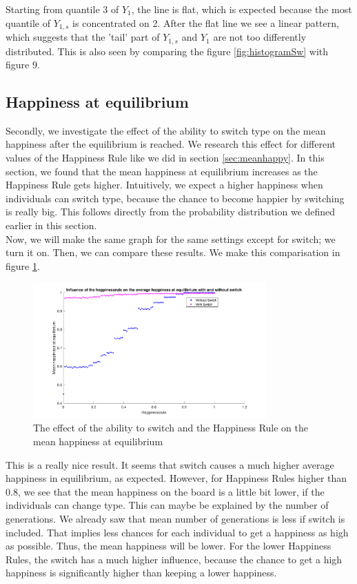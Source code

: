 Starting from quantile 3 of $Y_1$, the line is flat, which is expected because the most quantile of $Y_{1,s}$ is concentrated on 2. After the flat line we see a linear pattern, which suggests that the 'tail' part of $Y_{1,s}$ and $Y_1$ are not too differently distributed. This is also seen by comparing the figure \ref{fig:histogramSw} with figure 9.

\subsection{Happiness at equilibrium}

Secondly, we investigate the effect of the ability to switch type on the mean happiness after the equilibrium is reached.
We research this effect for different values of the Happiness Rule like we did in section \ref{sec:meanhappy}.
In this section, we found that the mean happiness at equilibrium increases as the Happiness Rule gets higher.
Intuitively, we expect a higher happiness when individuals can switch type, because the chance to become happier by switching is really big.
This follows directly from the probability distribution we defined earlier in this section.\\

Now, we will make the same graph for the same settings except for switch; we turn it on. 
Then, we can compare these results.
We make this comparisation in figure \ref{fig:meanhappyswitch}.

\begin{figure}[H]
    \centering
    \includegraphics[width=0.8\textwidth]{happinessrule-meanhappiness-switch.pdf}
    \caption{The effect of the ability to switch and the Happiness Rule on the mean happiness at equilibrium}
    \label{fig:meanhappyswitch}
\end{figure}

This is a really nice result.
It seems that switch causes a much higher average happiness in equilibrium, as expected.
However, for Happiness Rules higher than $0.8$, we see that the mean happiness on the board is a little bit lower, if the individuals can change type.
This can maybe be explained by the number of generations.
We already saw that mean number of generations is less if switch is included.
That implies less chances for each individual to get a happiness as high as possible.
Thus, the mean happiness will be lower.
For the lower Happiness Rules, the switch has a much higher influence, because the chance to get a high happiness is significantly higher than keeping a lower happiness.

